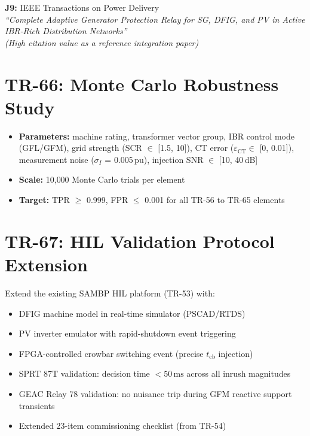 \documentclass[12pt, a4paper]{report}
\begin{document}
\begin{tcolorbox}[pubbox, title={Publications — TR-65}]
\textbf{J9:} IEEE Transactions on Power Delivery\\
\textit{``Complete Adaptive Generator Protection Relay for SG, DFIG, and PV in Active IBR-Rich Distribution Networks''}\\
\textit{(High citation value as a reference integration paper)}
\end{tcolorbox}

\section{TR-66: Monte Carlo Robustness Study}

\begin{itemize}[nosep]
  \item \textbf{Parameters:} machine rating, transformer vector group, IBR control mode (GFL/GFM), grid strength (SCR $\in$ [1.5, 10]), CT error ($\varepsilon_\mathrm{CT} \in$ [0, 0.01]), measurement noise ($\sigma_I$ = 0.005\,pu), injection SNR $\in$ [10, 40\,dB]
  \item \textbf{Scale:} 10{,}000 Monte Carlo trials per element
  \item \textbf{Target:} TPR $\ge$ 0.999, FPR $\le$ 0.001 for all TR-56 to TR-65 elements
\end{itemize}

\section{TR-67: HIL Validation Protocol Extension}

Extend the existing SAMBP HIL platform (TR-53) with:
\begin{itemize}[nosep]
  \item DFIG machine model in real-time simulator (PSCAD/RTDS)
  \item PV inverter emulator with rapid-shutdown event triggering
  \item FPGA-controlled crowbar switching event (precise $t_\mathrm{cb}$ injection)
  \item SPRT 87T validation: decision time $< 50\,\mathrm{ms}$ across all inrush magnitudes
  \item GEAC Relay 78 validation: no nuisance trip during GFM reactive support transients
  \item Extended 23-item commissioning checklist (from TR-54)
\end{itemize}
\end{document}
